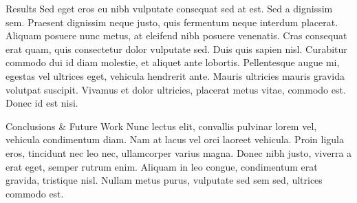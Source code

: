 \documentclass{beamer}
\begin{document}
\begin{frame}
\begin{columns}[t]
\begin{column}{.3\paperwidth}
\begin{block}{Results}
			Sed eget eros eu nibh vulputate consequat sed at est. Sed a dignissim sem. Praesent dignissim neque justo, quis fermentum neque interdum placerat. Aliquam posuere nunc metus, at eleifend nibh posuere venenatis. Cras consequat erat quam, quis consectetur dolor vulputate sed. Duis quis sapien nisl. Curabitur commodo dui id diam molestie, et aliquet ante lobortis. Pellentesque augue mi, egestas vel ultrices eget, vehicula hendrerit ante. Mauris ultricies mauris gravida volutpat suscipit. Vivamus et dolor ultricies, placerat metus vitae, commodo est. Donec id est nisi. 
		\end{block}
		\vfill
		\baselineskip
		\begin{block}{Conclusions \& Future Work}
			Nunc lectus elit, convallis pulvinar lorem vel, vehicula condimentum diam. Nam at lacus vel orci laoreet vehicula. Proin ligula eros, tincidunt nec leo nec, ullamcorper varius magna. Donec nibh justo, viverra a erat eget, semper rutrum enim. Aliquam in leo congue, condimentum erat gravida, tristique nisl. Nullam metus purus, vulputate sed sem sed, ultrices commodo est. 
		\end{block}
	\end{column}
\end{columns}
\end{frame}
\end{document}
